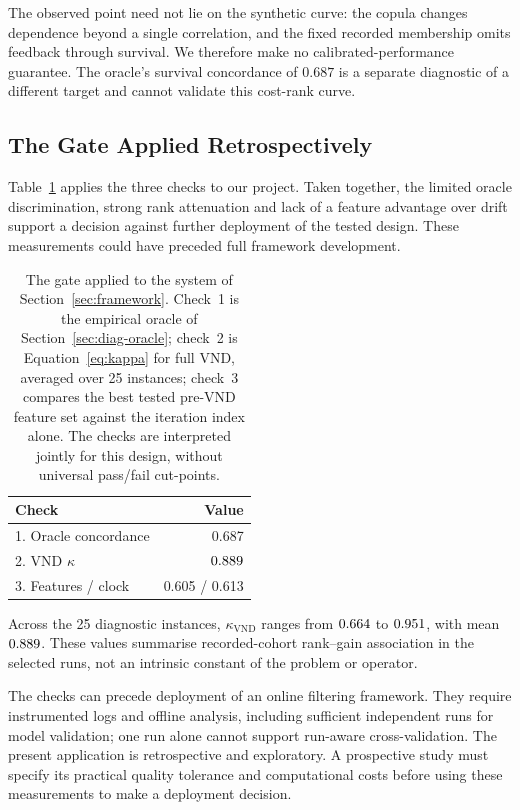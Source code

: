 \documentclass[a4paper,fleqn]{cas-dc}
\begin{document}
The observed point need not lie on the synthetic curve: the copula changes
dependence beyond a single correlation, and the fixed recorded membership omits
feedback through survival. We therefore make no calibrated-performance guarantee.
The oracle's survival concordance of $0.687$ is a separate diagnostic of a
different target and cannot validate this cost-rank curve.

\subsection{The Gate Applied Retrospectively}\label{sec:gate-applied}

Table~\ref{tab:gate} applies the three checks to our project. Taken together,
the limited oracle discrimination, strong rank attenuation and lack of a feature
advantage over drift support a decision against further deployment of the tested
design. These measurements could have preceded full framework development.

\begin{table}[htbp]
\caption{The gate applied to the system of Section~\ref{sec:framework}. Check~1
is the empirical oracle of Section~\ref{sec:diag-oracle}; check~2 is
Equation~\eqref{eq:kappa} for full VND, averaged over 25 instances; check~3 compares the best
tested pre-VND feature set against the iteration index alone. The checks are
interpreted jointly for this design, without universal pass/fail cut-points.}
\label{tab:gate}
\centering\small
\begin{tabular}{lr}
\toprule
Check & Value \\
\midrule
1. Oracle concordance      & 0.687 \\
2. VND $\kappa$           & $0.889$ \\
3. Features / clock        & 0.605 / 0.613 \\
\bottomrule
\end{tabular}
\end{table}

Across the 25 diagnostic instances, $\kappa_{\mathrm{VND}}$ ranges from
$0.664$ to $0.951$, with mean $0.889$.
These values summarise recorded-cohort rank--gain association in the selected
runs, not an intrinsic constant of the problem or operator.

The checks can precede deployment of an online filtering framework. They require
instrumented logs and offline analysis, including sufficient independent runs
for model validation; one run alone cannot support run-aware cross-validation.
The present application is retrospective and exploratory. A prospective study
must specify its practical quality tolerance and computational costs before
using these measurements to make a deployment decision.
\end{document}
